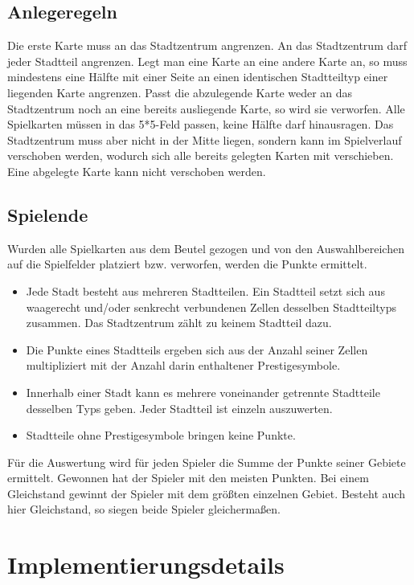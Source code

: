 \subsection{Anlegeregeln}
Die erste Karte muss an das Stadtzentrum angrenzen. An das Stadtzentrum darf jeder Stadtteil angrenzen. Legt man eine Karte an eine andere Karte an, so muss mindestens eine Hälfte mit einer Seite an einen identischen Stadtteiltyp einer liegenden Karte angrenzen.
Passt die abzulegende Karte weder an das Stadtzentrum noch an eine bereits ausliegende Karte, so wird sie verworfen.
Alle Spielkarten müssen in das 5*5-Feld passen, keine Hälfte darf hinausragen. Das Stadtzentrum muss aber nicht in der Mitte liegen, sondern kann im Spielverlauf verschoben werden, wodurch sich alle bereits gelegten Karten mit verschieben.
Eine abgelegte Karte kann nicht verschoben werden.


\subsection{Spielende}
Wurden alle Spielkarten aus dem Beutel gezogen und von den Auswahlbereichen auf die Spielfelder platziert bzw. verworfen, werden die Punkte ermittelt.
\begin{itemize}
	\item Jede Stadt besteht aus mehreren Stadtteilen. Ein Stadtteil setzt sich aus waagerecht und/oder senkrecht verbundenen Zellen desselben Stadtteiltyps zusammen. Das Stadtzentrum zählt zu keinem Stadtteil dazu.
	\item Die Punkte eines Stadtteils ergeben sich aus der Anzahl seiner Zellen multipliziert mit der Anzahl darin enthaltener Prestigesymbole.
	\item Innerhalb einer Stadt kann es mehrere voneinander getrennte Stadtteile desselben Typs geben. Jeder Stadtteil ist einzeln auszuwerten.
	\item Stadtteile ohne Prestigesymbole bringen keine Punkte.
\end{itemize}
Für die Auswertung wird für jeden Spieler die Summe der Punkte seiner Gebiete ermittelt. Gewonnen hat der Spieler mit den meisten Punkten. Bei einem Gleichstand gewinnt der Spieler mit dem größten einzelnen Gebiet. Besteht auch hier Gleichstand, so siegen beide Spieler gleichermaßen.

\section{Implementierungsdetails}

